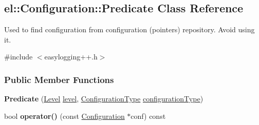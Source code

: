 \hypertarget{a00069}{}\subsection{el\+:\+:Configuration\+:\+:Predicate Class Reference}
\label{a00069}


Used to find configuration from configuration (pointers) repository. Avoid using it.  




{\ttfamily \#include $<$easylogging++.\+h$>$}

\subsubsection*{Public Member Functions}
\begin{DoxyCompactItemize}
\item 
\hypertarget{a00069_ab0a4580d6c2d1aaf36a62913fdc38447}{}{\bfseries Predicate} (\hyperlink{a00183_ab0ac6091262344c52dd2d3ad099e8e36}{Level} \hyperlink{a00013_a66a96cf46d20204c50718f8a5e3622e2}{level}, \hyperlink{a00183_a281f5db6d6163678bc68a8b23b59e124}{Configuration\+Type} \hyperlink{a00013_aab5091dcca176e309c0a2268ff55db0d}{configuration\+Type})\label{a00069_ab0a4580d6c2d1aaf36a62913fdc38447}

\item 
\hypertarget{a00069_a985dce44ae06854e789a2ad3be11698f}{}bool {\bfseries operator()} (const \hyperlink{a00013}{Configuration} $\ast$conf) const \label{a00069_a985dce44ae06854e789a2ad3be11698f}

\end{DoxyCompactItemize}
